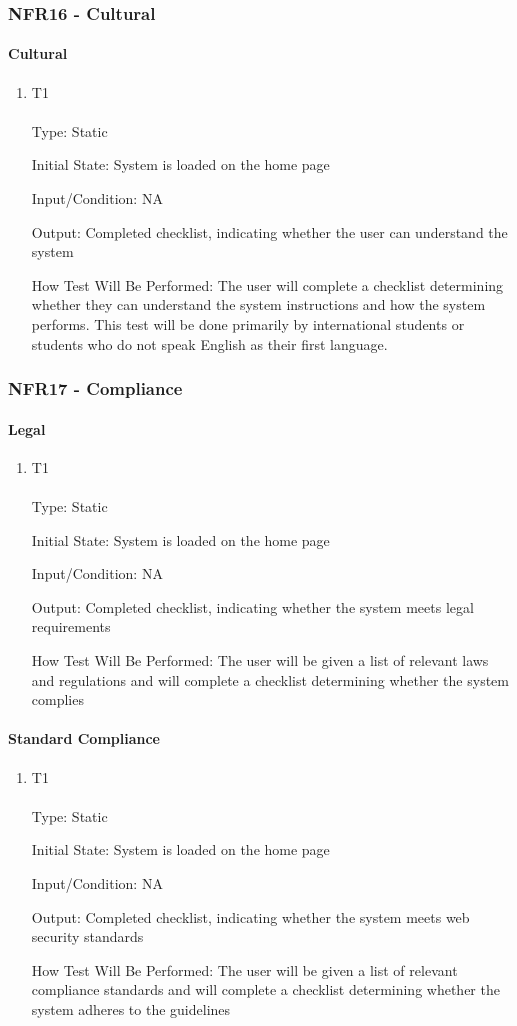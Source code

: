 \documentclass[12pt, titlepage]{article}
\begin{document}
\subsubsection{NFR16 - Cultural}
\paragraph{Cultural}
\begin{enumerate}
\item {T1\\}\\
Type: Static

Initial State: System is loaded on the home page

Input/Condition: NA

Output: Completed checklist, indicating whether the user can understand the system

How Test Will Be Performed: The user will complete a checklist determining whether they can understand the system instructions and how the system performs. This test will be done primarily by international students or students who do not speak English as their first language.
\end{enumerate}
\subsubsection{NFR17 - Compliance}
\paragraph{Legal}
\begin{enumerate}
\item {T1\\}\\
Type: Static

Initial State: System is loaded on the home page

Input/Condition: NA

Output: Completed checklist, indicating whether the system meets legal requirements

How Test Will Be Performed: The user will be given a list of relevant laws and regulations and will complete a checklist determining whether the system complies
\end{enumerate}
\paragraph{Standard Compliance}
\begin{enumerate}
\item {T1\\}\\
Type: Static

Initial State: System is loaded on the home page

Input/Condition: NA

Output: Completed checklist, indicating whether the system meets web security standards

How Test Will Be Performed: The user will be given a list of relevant compliance standards and will complete a checklist determining whether the system adheres to the guidelines
\end{enumerate}
\end{document}
